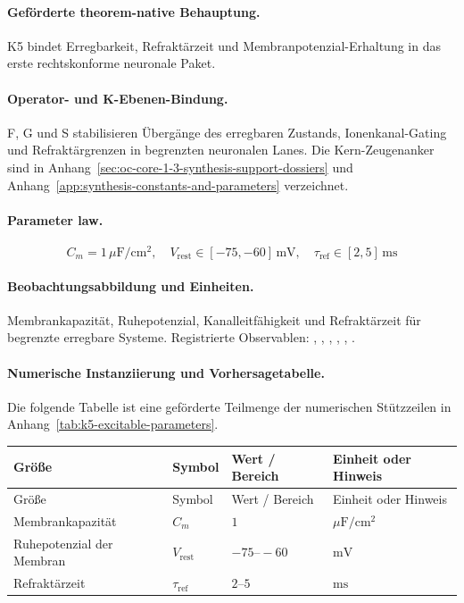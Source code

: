 \paragraph{Geförderte theorem-native Behauptung.}
K5 bindet Erregbarkeit, Refraktärzeit und Membranpotenzial-Erhaltung in das erste rechtskonforme neuronale Paket.

\paragraph{Operator- und K-Ebenen-Bindung.}
F, G und S stabilisieren Übergänge des erregbaren Zustands, Ionenkanal-Gating und Refraktärgrenzen in begrenzten neuronalen Lanes.
Die Kern-Zeugenanker sind in Anhang~\ref{sec:oc-core-1-3-synthesis-support-dossiers} und Anhang~\ref{app:synthesis-constants-and-parameters} verzeichnet.

\paragraph{Parameter law.}
\[
C_m = 1\,\mu\mathrm{F/cm^2},\quad V_{\mathrm{rest}} \in [-75,-60]\,\mathrm{mV},\quad \tau_{\mathrm{ref}} \in [2,5]\,\mathrm{ms}
\]

\paragraph{Beobachtungsabbildung und Einheiten.}
Membrankapazität, Ruhepotenzial, Kanalleitfähigkeit und Refraktärzeit für begrenzte erregbare Systeme.
Registrierte Observablen: , \allowbreak {}, \allowbreak {}, \allowbreak {}, \allowbreak {}, \allowbreak {}.

\paragraph{Numerische Instanziierung und Vorhersagetabelle.}
Die folgende Tabelle ist eine geförderte Teilmenge der numerischen Stützzeilen in Anhang~\ref{tab:k5-excitable-parameters}.
\begin{longtable}{@{}L{0.27\textwidth}L{0.15\textwidth}L{0.24\textwidth}L{0.16\textwidth}@{}}
\toprule
Größe & Symbol & Wert / Bereich & Einheit oder Hinweis \\
\midrule
\endfirsthead
\toprule
Größe & Symbol & Wert / Bereich & Einheit oder Hinweis \\
\midrule
\endhead
Membrankapazität & $\scriptstyle C_m$ & $1$ & $\mu\mathrm{F/cm^2}$ \\
Ruhepotenzial der Membran & $\scriptstyle V_{\mathrm{rest}}$ & $-75\text{--}-60$ & $\mathrm{mV}$ \\
Refraktärzeit & $\scriptstyle \tau_{\mathrm{ref}}$ & $2\text{--}5$ & $\mathrm{ms}$ \\
\bottomrule
\end{longtable}

